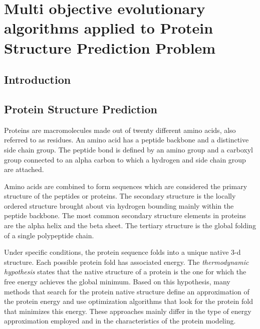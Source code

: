 
\chapter{Multi objective evolutionary algorithms applied to Protein Structure Prediction Problem}


\section{Introduction} \label{sec:intro}



\section{Protein Structure Prediction} \label{sec:proteinfolding}


Proteins are macromolecules made out of  twenty different amino acids, also referred to as residues. An amino acid has a peptide backbone and a distinctive side chain group. The peptide bond is defined by an amino group and a carboxyl group connected to an alpha carbon to which  a hydrogen and side chain group are attached.


Amino acids are combined to form sequences which are considered the primary structure of the peptides or proteins. The secondary structure is the locally ordered structure brought about via hydrogen bounding mainly within the peptide backbone. The most common secondary structure elements in proteins are the alpha helix and the beta sheet. The tertiary structure is the global folding of a single polypeptide chain.


Under specific conditions, the protein sequence folds into a unique native 3-d structure. Each possible protein fold has associated energy. The \emph{thermodynamic hypothesis} states that the native structure of a protein is the one for which the free energy achieves the global minimum. Based on this hypothesis, many methods that search for the protein native structure define an approximation of the protein energy and use optimization algorithms that look for the protein fold that minimizes this energy. These approaches mainly differ in the type of energy approximation employed and in the characteristics of the protein modeling.


